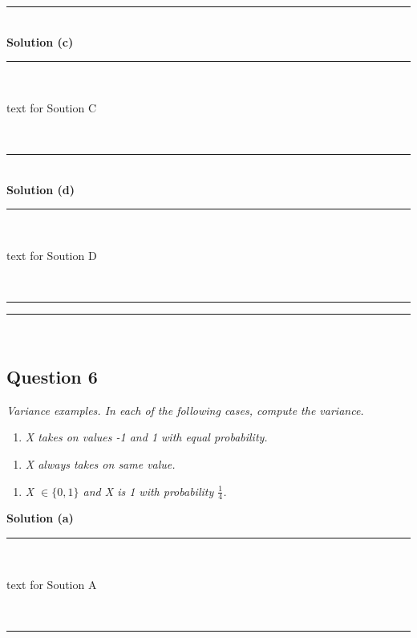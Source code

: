 \documentclass{article}
\begin{document}
\noindent\rule{\textwidth}{0.4pt}\\

\textbf{Solution (c)}

\noindent\rule{\textwidth}{0.4pt}\\

\parbox{\textwidth}{text for Soution C}\\

\noindent\rule{\textwidth}{0.4pt}\\

\textbf{Solution (d)}

\noindent\rule{\textwidth}{0.4pt}\\

\parbox{\textwidth}{text for Soution D}\\

\noindent\rule{\textwidth}{0.4pt}
\noindent\rule{\textwidth}{0.4pt}\\

\newpage

\subsection*{Question 6}
\textit{Variance examples. In each of the following cases, compute the variance.}\\

\begin{enumerate}[label=(a)]
  \item \textit{X takes on values -1 and 1 with equal probability.}
\end{enumerate}

\begin{enumerate}[label=(b)]
  \item \textit{X always takes on same value.}
\end{enumerate}

\begin{enumerate}[label=(c)]
  \item \textit{X $\in \{0,1\}$ and X is 1 with probability $\frac{1}{4}$.}
\end{enumerate}

\textbf{Solution (a)}

\noindent\rule{\textwidth}{0.4pt}\\

\parbox{\textwidth}{text for Soution A}\\

\noindent\rule{\textwidth}{0.4pt}\\
\end{document}
